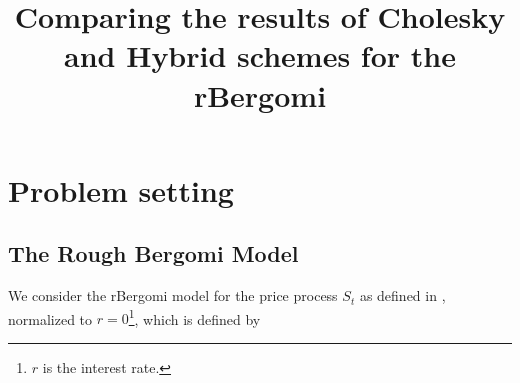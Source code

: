 \documentclass[11pt]{article}
\title{Comparing the results of Cholesky and Hybrid schemes for the rBergomi }
\begin{document}
\maketitle







\thispagestyle{plain}

\setcounter{tocdepth}{1}

%


 \section{Problem setting}\label{sec:Problem setting}

\subsection{The Rough Bergomi Model}

We consider the rBergomi model for the price process $S_t$ as defined in  \cite{bayer2016pricing}, normalized to $r=0$\footnote{$r$ is the interest rate.}, which is defined by
\end{document}

